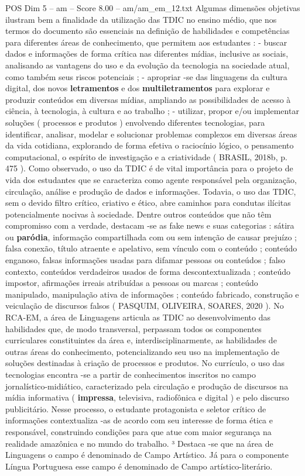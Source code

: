 \begin{textsample}{POS Dim 5 – am – Score 8.00 – am/am\_em\_12.txt}
Algumas dimensões objetivas ilustram bem a finalidade da utilização das TDIC no ensino médio, que nos termos do documento são essenciais na definição de habilidades e competências para diferentes áreas de conhecimento, que permitem aos estudantes : - buscar dados e informações de forma crítica nas diferentes mídias, inclusive as sociais, analisando as vantagens do uso e da evolução da tecnologia na sociedade atual, como também seus riscos potenciais ; - apropriar -se das linguagens da cultura digital, dos novos \textbf{letramentos} e dos \textbf{multiletramentos} para explorar e produzir conteúdos em diversas mídias, ampliando as possibilidades de acesso à ciência, à tecnologia, à cultura e ao trabalho ; - utilizar, propor e/ou implementar soluções ( processos e produtos ) envolvendo diferentes tecnologias, para identificar, analisar, modelar e solucionar problemas complexos em diversas áreas da vida cotidiana, explorando de forma efetiva o raciocínio lógico, o pensamento computacional, o espírito de investigação e a criatividade ( BRASIL, 2018b, p. 475 ).
Como observado, o uso da TDIC é de vital importância para o projeto de vida dos estudantes que se caracteriza como agente responsável pela organização, circulação, análise e produção de dados e informações.
Todavia, o uso das TDIC, sem o devido filtro crítico, criativo e ético, abre caminhos para condutas ilícitas potencialmente nocivas à sociedade.
Dentre outros conteúdos que não têm compromisso com a verdade, destacam -se as fake news e suas categorias : sátira ou \textbf{paródia}, informação compartilhada com ou sem intenção de causar prejuízo ; falsa conexão, título atraente e apelativo, sem vínculo com o conteúdo ; conteúdo enganoso, falsas informações usadas para difamar pessoas ou conteúdos ; falso contexto, conteúdos verdadeiros usados de forma descontextualizada ; conteúdo impostor, afirmações irreais atribuídas a pessoas ou marcas ; conteúdo manipulado, manipulação ativa de informações ; conteúdo fabricado, construção e veiculação de discursos falsos ( PASQUIM, OLIVEIRA, SOARES, 2020 ).
No RCA-EM, a área de Linguagens articula as TDIC ao desenvolvimento das habilidades que, de modo transversal, perpassam todos os componentes curriculares constituintes da área e, interdisciplinarmente, as habilidades de outras áreas do conhecimento, potencializando seu uso na implementação de soluções destinadas à criação de processos e produtos.
No currículo, o uso das tecnologias encontra -se a partir de conhecimentos inscritos no campo jornalístico-midiático, caracterizado pela circulação e produção de discursos na mídia informativa ( \textbf{impressa}, televisiva, radiofônica e digital ) e pelo discurso publicitário.
Nesse processo, o estudante protagonista e seletor crítico de informações contextualiza -as de acordo com seu interesse de forma ética e responsável, construindo condições para que atue com maior segurança na realidade amazônica e no mundo do trabalho. ³ Destaca -se que na área de Linguagens o campo é denominado de Campo Artístico.
Já para o componente Língua Portuguesa esse campo é denominado de Campo artístico-literário.

\end{textsample}
